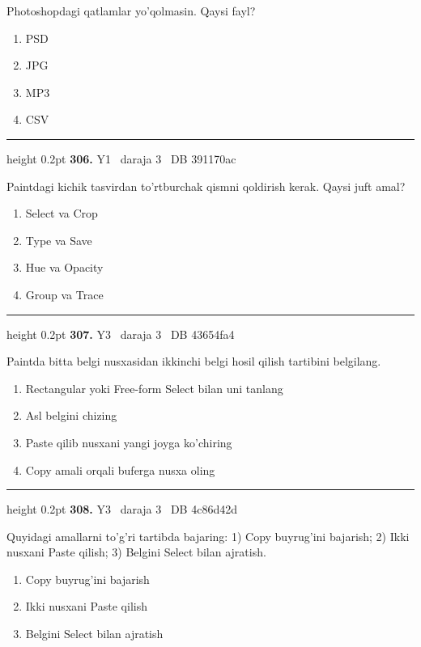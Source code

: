 \documentclass[10pt,a4paper,oneside]{article}
\begin{document}
\par
Photoshopdagi qatlamlar yo'qolmasin. Qaysi fayl?
\begin{enumerate}[label=\Alph*),leftmargin=9mm]
\item PSD
\item JPG
\item MP3
\item CSV
\end{enumerate}
\vspace{2mm}\hrule height 0.2pt \vspace{4mm}
\hypertarget{q306}{\textbf{\color{ink}306.}}  {\color{muted}\scriptsize Y1 \textbullet\ daraja 3 \textbullet\ DB 391170ac}
\par
Paintdagi kichik tasvirdan to'rtburchak qismni qoldirish kerak. Qaysi juft amal?
\begin{enumerate}[label=\Alph*),leftmargin=9mm]
\item Select va Crop
\item Type va Save
\item Hue va Opacity
\item Group va Trace
\end{enumerate}
\vspace{2mm}\hrule height 0.2pt \vspace{4mm}
\hypertarget{q307}{\textbf{\color{ink}307.}}  {\color{muted}\scriptsize Y3 \textbullet\ daraja 3 \textbullet\ DB 43654fa4}
\par
Paintda bitta belgi nusxasidan ikkinchi belgi hosil qilish tartibini belgilang.
\begin{enumerate}[label=\Alph*),leftmargin=9mm]
\item Rectangular yoki Free-form Select bilan uni tanlang
\item Asl belgini chizing
\item Paste qilib nusxani yangi joyga ko'chiring
\item Copy amali orqali buferga nusxa oling
\end{enumerate}
\vspace{2mm}\hrule height 0.2pt \vspace{4mm}
\hypertarget{q308}{\textbf{\color{ink}308.}}  {\color{muted}\scriptsize Y3 \textbullet\ daraja 3 \textbullet\ DB 4c86d42d}
\par
Quyidagi amallarni to'g'ri tartibda bajaring: 1) Copy buyrug'ini bajarish; 2) Ikki nusxani Paste qilish; 3) Belgini Select bilan ajratish.
\begin{enumerate}[label=\Alph*),leftmargin=9mm]
\item Copy buyrug'ini bajarish
\item Ikki nusxani Paste qilish
\item Belgini Select bilan ajratish
\end{enumerate}
\end{document}
